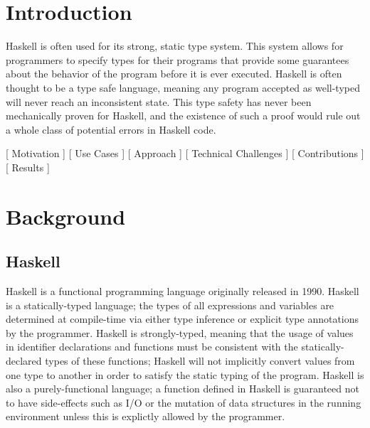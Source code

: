 \documentclass{sig-alternate}
\begin{document}

\section{Introduction}
\label{sec:intro}

Haskell is often used for its strong, static type system. This system allows for programmers to specify types for their programs that provide some guarantees about the behavior of the program before it is ever executed. Haskell is often thought to be a type safe language, meaning any program accepted as well-typed will never reach an inconsistent state. This type safety has never been mechanically proven for Haskell, and the existence of such a proof would rule out a whole class of potential errors in Haskell code.

[ Motivation ]
[ Use Cases ]
[ Approach ]
[ Technical Challenges ]
[ Contributions ]
[ Results ]

\section{Background}
\label{sec:background}

\subsection{Haskell}
\label{sec:background-haskell}

Haskell is a functional programming language originally released in 1990. Haskell is a statically-typed language; the types of all expressions and variables are determined at compile-time via either type inference or explicit type annotations by the programmer. Haskell is strongly-typed, meaning that the usage of values in identifier declarations and functions must be consistent with the statically-declared types of these functions; Haskell will not implicitly convert values from one type to another in order to satisfy the static typing of the program. Haskell is also a purely-functional language; a function defined in Haskell is guaranteed not to have side-effects such as I/O or the mutation of data structures in the running environment unless this is explictly allowed by the programmer. 
\end{document}
